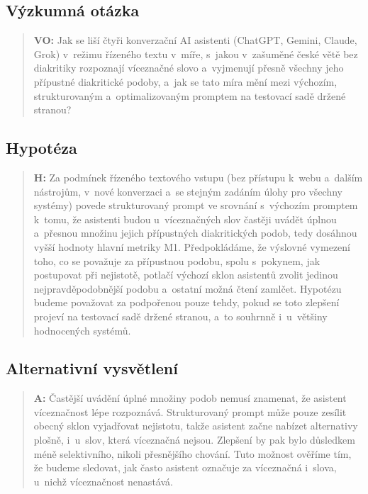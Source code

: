 \documentclass[11pt,a4paper]{article}
\begin{document}
\subsection{Výzkumná otázka}
\begin{quote}
\textbf{VO:} Jak se liší čtyři konverzační AI asistenti (ChatGPT, Gemini,
Claude, Grok) v~režimu řízeného textu v~míře, s~jakou v~zašuměné české
větě bez diakritiky rozpoznají víceznačné slovo a~vyjmenují přesně
všechny jeho přípustné diakritické podoby, a~jak se tato míra mění mezi
výchozím, strukturovaným a~optimalizovaným promptem na testovací sadě
držené stranou?
\end{quote}

\subsection{Hypotéza}
\begin{quote}
\textbf{H:} Za podmínek řízeného textového vstupu (bez přístupu k~webu
a~dalším nástrojům, v~nové konverzaci a~se stejným zadáním úlohy pro
všechny systémy) povede strukturovaný prompt ve srovnání s~výchozím
promptem k~tomu, že asistenti budou u~víceznačných slov častěji uvádět
úplnou a~přesnou množinu jejich přípustných diakritických podob, tedy
dosáhnou vyšší hodnoty hlavní metriky M1.
Předpokládáme, že výslovné vymezení toho, co se považuje za přípustnou
podobu, spolu s~pokynem, jak postupovat při nejistotě, potlačí výchozí
sklon asistentů zvolit jedinou nejpravděpodobnější podobu a~ostatní
možná čtení zamlčet. Hypotézu budeme považovat za podpořenou pouze
tehdy, pokud se toto zlepšení projeví na testovací sadě držené stranou,
a~to souhrnně i~u~většiny hodnocených systémů.
\end{quote}

\subsection{Alternativní vysvětlení}
\begin{quote}
\textbf{A:} Častější uvádění úplné množiny podob nemusí znamenat, že
asistent víceznačnost lépe rozpoznává. Strukturovaný prompt může pouze
zesílit obecný sklon vyjadřovat nejistotu, takže asistent začne nabízet
alternativy plošně, i~u~slov, která víceznačná nejsou. Zlepšení by pak
bylo důsledkem méně selektivního, nikoli přesnějšího chování. Tuto
možnost ověříme tím, že budeme sledovat, jak často asistent označuje za
víceznačná i~slova, u~nichž víceznačnost nenastává.
\end{quote}
\end{document}
